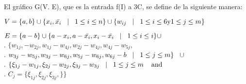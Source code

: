 El gráfico G(V. E), que es la entrada f(I) a 3C, se define de la siguiente manera:

$ V = \{ a,b \} \cup \{ x_{i}, \bar{x_{i}} \hspace{3mm} | \hspace{3mm} 1 \leq i \leq n \}  \cup \{ w_{ij} \hspace{3mm} | \hspace{3mm} 1 \leq i \leq 6 \text{y} 1 \leq j \leq m \}$

$ E = \{a - b\} \cup \{a - x_{i}, a - \bar{x_{i}}, x_{i} - \bar{x_{i}} \hspace{3mm} | \hspace{3mm} 1 \leq i \leq i \} \cup$\\
\textcolor{AzulRey}{.} \hspace{12mm} $\{w_{1j}, - w_{2j}, w_{1j} - w_{4j}, w_{2j} - w_{4j}, w_{4j} - w_{5j}, $ \\
\textcolor{AzulRey}{.} \hspace{12mm} $ w_{3j} - w_{5j}, w_{3j} - w_{6j}, w_{5j} - w_{6j}, w_{6j} - b \hspace{3mm} | \hspace{3mm} 1 \leq j \leq m \}  \hspace{3mm} \cup $ \\ 
\textcolor{AzulRey}{.} \hspace{12mm} $\{ \xi_{1j} -  w_{1j},  \xi_{2j} - w_{2j}, \xi_{3j} -  w_{3j}  \hspace{3mm} | \hspace{3mm} 1 \leq j \leq m  \hspace{4mm} \text{and} $ \\ 
\textcolor{AzulRey}{.} \hspace{12mm} $C_{j} = \{ \xi_{1j},  \xi_{2j},  \xi_{3j}, \}\} $\\ 


